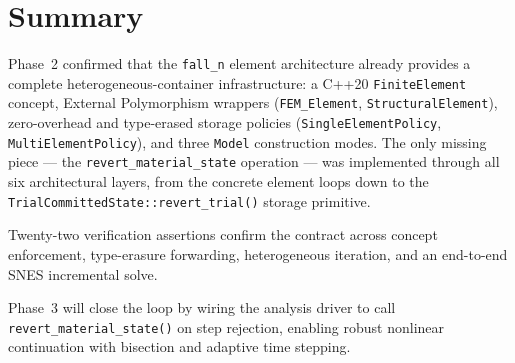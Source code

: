 \section{Summary}
\label{sec:phase2-summary}

Phase~2 confirmed that the \texttt{fall\_n} element architecture already
provides a complete heterogeneous-container infrastructure: a C++20
\texttt{FiniteElement} concept, External Polymorphism wrappers
(\texttt{FEM\_Element}, \texttt{StructuralElement}), zero-overhead and
type-erased storage policies (\texttt{SingleElementPolicy},
\texttt{MultiElementPolicy}), and three \texttt{Model} construction
modes.  The only missing piece --- the \texttt{revert\_material\_state}
operation --- was implemented through all six architectural layers, from
the concrete element loops down to the
\texttt{TrialCommittedState::revert\_trial()} storage primitive.

Twenty-two verification assertions confirm the contract across concept
enforcement, type-erasure forwarding, heterogeneous iteration, and an
end-to-end SNES incremental solve.

Phase~3 will close the loop by wiring the analysis driver to call
\texttt{revert\_material\_state()} on step rejection, enabling robust
nonlinear continuation with bisection and adaptive time stepping.
